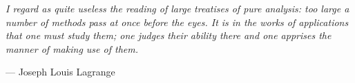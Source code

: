 

\newcommand{\epigraph}[3]{
\vspace{1em}\hfill{}\begin{minipage}{#1}{\begin{spacing}{0.9}
\small\noindent\textit{#2}\end{spacing}
\vspace{1em}
\hfill{}{#3}}\vspace{2em}
\end{minipage}}
\epigraph{.8\textwidth}{
  I regard as quite useless the reading of
  large treatises of pure analysis:
  too large a number of methods pass at once before the eyes.
  It is in the works of applications that one must study them;
  one judges their ability there and
  one apprises the manner of making use of them.}{
  --- Joseph Louis Lagrange}



